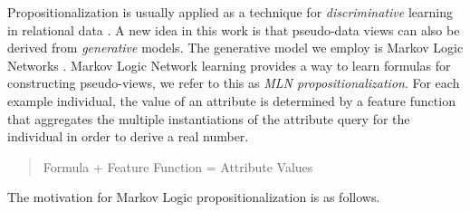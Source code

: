  Propositionalization is usually applied as a technique for {\em discriminative} learning in relational data \cite{Kramer2000}. A new idea in this work is that pseudo-\iid data views can also be derived from {\em generative} models. The generative model we employ is Markov Logic Networks \cite{Domingos2009}. Markov Logic Network learning provides a way to learn formulas for constructing pseudo-\iid views, we refer to this as {\em MLN propositionalization}.
For each example individual, the value of an attribute  is determined by a feature function that aggregates the multiple instantiations of the attribute query for the individual in order to derive a real number.%
% 	
\begin{quote}
	Formula + Feature Function = Attribute Values
\end{quote}








The motivation for Markov Logic propositionalization is as follows.
	
